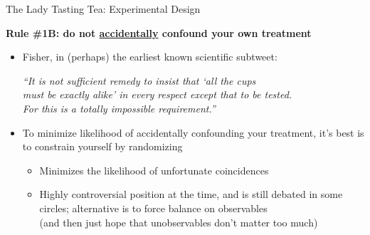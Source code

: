 \documentclass[10pt,xcolor=table,ignorenonframetext,handout,aspectratio=169]{beamer}
\newlength{\wideitemsep}
\let\olditem\item
\renewcommand{\item}{\setlength{\itemsep}{\wideitemsep}\olditem}
\begin{document}
\begin{frame}{The Lady Tasting Tea:  Experimental Design}

\medskip
\textbf{Rule \#1B:  do not \underline{accidentally} confound your own treatment}

\medskip
\begin{itemize}
	
	\item Fisher, in (perhaps) the earliest known scientific subtweet:
	
	\medskip
	\begin{center}
		\emph{``It is not sufficient remedy to insist that `all the cups \\
			must be exactly alike' in every respect except that to be tested.  \\
			For this is a totally impossible requirement.''}
	\end{center}
	
	\pause
	\medskip
	\item To minimize likelihood of accidentally confounding your treatment, it's best is to constrain yourself by randomizing
	
	\medskip
	\begin{itemize}
		
		\item Minimizes the likelihood of unfortunate coincidences
		
		\item Highly controversial position at the time, and is still debated in some circles; alternative is to force balance on observables \\ (and then just hope that unobservables don't matter too much)
		
	\end{itemize}
	
\end{itemize}

\end{frame}


\end{document}
